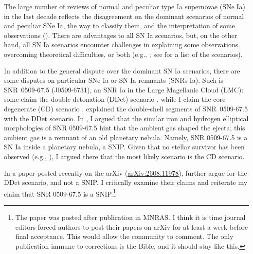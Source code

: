\documentclass[twocolumn]{aastex701}
\begin{document}
The large number of reviews of normal and peculiar type Ia supernovae (SNe Ia) in the last decade reflects the disagreement on the dominant scenarios of normal and peculiar SNe Ia, the way to classify them, and the interpretation of some observations (\citealt{MaedaTerada2016, Hoeflich2017, LivioMazzali2018, Soker2018Rev, Soker2019Rev, Soker2024Rev, Wang2018,  Jhaetal2019NatAs, RuizLapuente2019, Ruiter2020, Aleoetal2023, Liuetal2023Rev, Vinkoetal2023, RuiterSeitenzahl2025}). There are advantages to all SN Ia scenarios, but, on the other hand, all SN Ia scenarios encounter challenges in explaining some observations, overcoming theoretical difficulties, or both (e.g., \citealt{Pearsonetal2024, Sharonetal2024, Sharonetal2025a, SchinasiLembergKushnir2025, Sharonetal2025b, Wangetal2024, Glanzetal2025, MengPodsiadlowski2026, Glanzetal2027}; see \citealt{Soker2026SNIPs} for a list of the scenarios).  
      
In addition to the general dispute over the dominant SN Ia scenarios, there are some disputes on particular SNe Ia or SN Ia remnants (SNRs Ia).  
Such is SNR~0509-67.5 (J0509-6731), an SNR Ia in the Large Magellanic Cloud (LMC): some claim the double-detonation (DDet) scenario \citep{Dasetal2025, Dasetal2026, Mandaletal2026}, while I claim the core-degenerate (CD) scenario \citep{Soker2025SNR0509}. 
\cite{Dasetal2025} explained the double-shell segments of SNR~0509-67.5 with the DDet scenario. 
In \cite{Soker2025SNR0509}, I argued that the similar iron and hydrogen elliptical morphologies of SNR 0509-67.5 hint that the ambient gas shaped the ejecta; this ambient gas is a remnant of
an old planetary nebula. Namely, SNR 0509-67.5 is a SN Ia inside a planetary nebula, a SNIP. Given that no stellar survivor has been observed (e.g., \citealt{SchaeferPagnotta2012, Panetal2014, Notaetal2016, Shieldsetal2023}), I argued there that the most likely scenario is the CD scenario. 

In a paper posted recently on the arXiv (\href{https://arxiv.org/abs/2608.11978}{arXiv:2608.11978}), \cite{Dasetal2026} further argue for the DDet scenario, and not a SNIP. I critically examine their claims and reiterate my claim that SNR 0509-67.5 is a SNIP.\footnote{The paper was posted after publication in MNRAS. I think it is time journal editors forced authors to post their papers on arXiv for at least a week before final acceptance. This would allow the community to comment. The only publication immune to corrections is the Bible, and it should stay like this.} 

\end{document}
